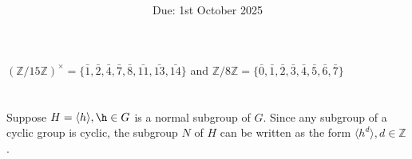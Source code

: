 \documentclass[12pt]{article}
\title{\textbf{\mytitle}}
\author{\textbf{\myauthor}}
\date{Due: 1st October 2025}
\begin{document}
\onehalfspacing
\maketitle

\section{} %
\subsection{} %
$(\mathbb{Z}/15\mathbb{Z})^{\times}=\{\bar{1},\bar{2},\bar{4},\bar{7},\bar{8},\bar{11},\bar{13},\bar{14}\}$ and $\mathbb{Z}/8\mathbb{Z}=\{\bar{0},\bar{1},\bar{2},\bar{3},\bar{4},\bar{5},\bar{6},\bar{7}\}$
\subsection{} %
\subsection{} %
\subsection{} %
\subsection{} %
\subsection{} %
\subsection{} %
\subsection{} %

\newpage
\section{} %

\newpage
\section{} %
\subsection{}
Suppose $H=\langle h\rangle,\h\in G$ is a normal subgroup of $G$. Since any subgroup of a cyclic group is cyclic, the subgroup $N$ of $H$ can be written as the form $\langle h^d\rangle,d\in \mathbb{Z}$.
\end{document}
